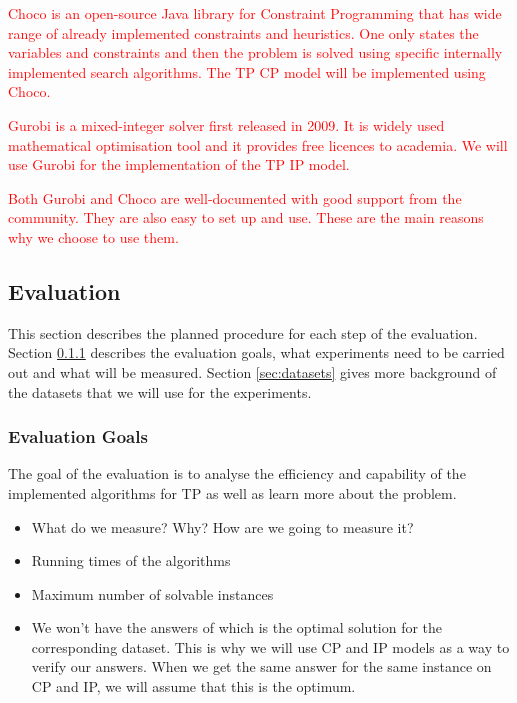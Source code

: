 \documentclass{mprop}
\theoremstyle{definition}
\begin{document}
\textcolor{red}{
Choco \citep{choco} is an open-source Java library for Constraint Programming that has wide range of already implemented constraints and heuristics. One only states the variables and constraints and then the problem is solved using specific internally implemented search algorithms. The TP CP model will be implemented using Choco.}

\textcolor{red}{
Gurobi is a mixed-integer solver first released in 2009. It is widely used mathematical optimisation tool \citep{gurobiusage} and it provides free licences to academia. We will use Gurobi for the implementation of the TP IP model.}

\textcolor{red}{
Both Gurobi and Choco are well-documented with good support from the community. They are also easy to set up and use. These are the main reasons why we choose to use them.}

\subsection{Evaluation}
\label{sec:evaluation}

This section describes the planned procedure for each step of the evaluation. Section \ref{sec:evaluationgoals} describes the evaluation goals, what experiments need to be carried out and what will be measured. Section \ref{sec:datasets} gives more background of the datasets that we will use for the experiments.

\subsubsection{Evaluation Goals}
\label{sec:evaluationgoals}
The goal of the evaluation is to analyse the efficiency and capability of the implemented algorithms for TP as well as learn more about the problem.

\begin{itemize}
\item What do we measure? Why? How are we going to measure it?
\item Running times of the algorithms
\item Maximum number of solvable instances
\item We won't have the answers of which is the optimal solution for the corresponding dataset. This is why we will use CP and IP models as a way to verify our answers. When we get the same answer for the same instance on CP and IP, we will assume that this is the optimum.
\end{itemize}
\end{document}
